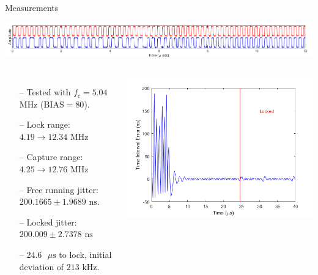 \documentclass{beamer}
\begin{document}
\begin{frame}{Measurements}
	\vspace*{-5mm}
	\begin{center}
		\includegraphics[scale=0.425]{../impl_waveform}
	\end{center}
   	\begin{columns}
    	\begin{itemize}
            \item[--]
                Tested with $f_c=5.04$ MHz ($\textrm{BIAS}=80$).
    		\item[--]
	    		Lock range: $4.19\rightarrow12.34\textrm{ MHz}$ 
            \item[--]
                Capture range: $4.25\rightarrow12.76\textrm{ MHz}$
            \item[--]
                Free running jitter: $200.1665\pm1.9689\textrm{ ns}$.
            \item[--]
                Locked jitter: $200.009\pm2.7378\textrm{ ns}$
            \item[--]
                $24.6\textrm{ }\mu\textrm{s}$ to lock, initial deviation of $213\textrm{ kHz}$. 
        \end{itemize}
    	
    	\includegraphics[scale=0.4]{../impl_locking}
    \end{columns}
 
\end{frame}
\end{document}
